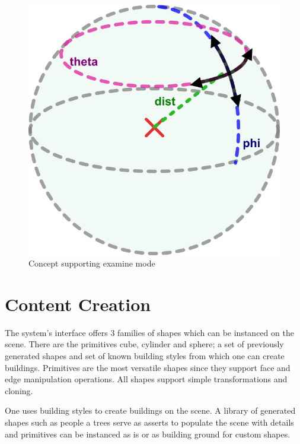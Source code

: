\begin{figure}[ht]
	\centering
		\includegraphics[scale=0.6]{gfx/virtual-sphere.png}
	\caption{Concept supporting examine mode}
	\label{fig:vsphere}
\end{figure}


\section{Content Creation}

The system's interface offers 3 families of shapes which can be instanced on the scene.
There are the primitives cube, cylinder and sphere; a set of previously generated shapes
and set of known building styles from which one can create buildings.
Primitives are the most versatile shapes since they support face and edge manipulation operations.
All shapes support simple transformations and cloning.

One uses building styles to create buildings on the scene. A library of generated shapes such as
people a trees serve as asserts to populate the scene with details and primitives can be instanced
as is or as building ground for custom shapes.

